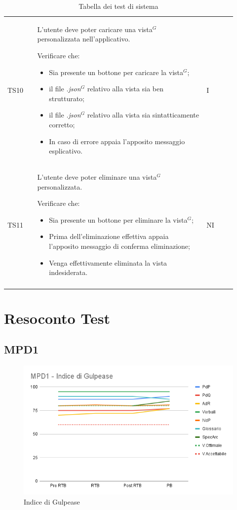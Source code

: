 \begin{longtable}{p{0.12\linewidth}p{0.68\linewidth}p{0.12\linewidth}}
    \rowcolor[RGB]{216, 235, 171}
    TS10 &
    L'utente deve poter caricare una vista$^{G}$ personalizzata nell'applicativo. \par
    Verificare che:
    \begin{itemize}
        \item Sia presente un bottone per caricare la vista$^{G}$;
        \item il file \textit{.json}$^{G}$ relativo alla vista sia ben strutturato;
        \item il file \textit{.json}$^{G}$ relativo alla vista sia sintatticamente corretto;
        \item In caso di errore appaia l'apposito messaggio esplicativo.
    \end{itemize}&
    I \\

    \rowcolor[RGB]{233, 245, 206}
    TS11 &
    L'utente deve poter eliminare una vista$^{G}$ personalizzata. \par
    Verificare che:
    \begin{itemize}
        \item Sia presente un bottone per eliminare la vista$^{G}$;
        \item Prima dell'eliminazione effettiva appaia l'apposito messaggio di conferma eliminazione;
        \item Venga effettivamente eliminata la vista indesiderata.
    \end{itemize}&
    NI \\

    \caption{Tabella dei test di sistema}
\end{longtable}	 

\newpage
\section{Resoconto Test}
\subsection{MPD1}
\begin{figure}[h!]
    \centering
    \includegraphics[scale=0.62]{../../assets/MPD1 - Indice di Gulpease.png}
    \caption{Indice di Gulpease}
\end{figure}
